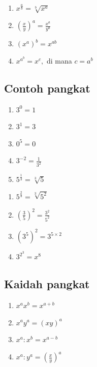 \documentclass[
  letterpaper,
  DIV=11,
  numbers=noendperiod]{scrartcl}
\providecommand{\tightlist}{%
  \setlength{\itemsep}{0pt}\setlength{\parskip}{0pt}}\usepackage{longtable,booktabs,array}
\begin{document}
\begin{enumerate}
\def\labelenumi{\arabic{enumi}.}
\setcounter{enumi}{5}
\tightlist
\item
  \(x^{\frac{a}{b}}=\sqrt[b]{x^a}\)
\item
  \({\left(\frac{x}{y}\right)}^a=\frac{x^a}{y^a}\)
\item
  \(\left(x^a\right)^b=x^{ab}\)
\item
  \(x^{a^b}=x^c,\) di mana \(c=a^b\)
\end{enumerate}

\hypertarget{contoh-pangkat}{%
\subsection{Contoh pangkat}\label{contoh-pangkat}}

\begin{enumerate}
\def\labelenumi{\arabic{enumi}.}
\tightlist
\item
  \(3^0=1\)
\item
  \(3^1=3\)
\item
  \(0^5=0\)
\item
  \(3^{-2}=\frac{1}{3^2}\)
\item
  \(5^{\frac{1}{3}}=\sqrt[3]{5}\)
\end{enumerate}

\begin{enumerate}
\def\labelenumi{\arabic{enumi}.}
\setcounter{enumi}{5}
\tightlist
\item
  \(5^{\frac{2}{3}}=\sqrt[3]{5^2}\)
\item
  \({\left(\frac{3}{5}\right)}^2=\frac{3^2}{5^2}\)
\item
  \(\left(3^5\right)^2=3^{5\times 2}\)
\item
  \(3^{2^3}=x^8\)
\end{enumerate}

\hypertarget{kaidah-pangkat-1}{%
\subsection{Kaidah pangkat}\label{kaidah-pangkat-1}}

\begin{enumerate}
\def\labelenumi{\arabic{enumi}.}
\setcounter{enumi}{9}
\item
  \(x^ax^b=x^{a+b}\)
\item
  \(x^ay^a=(xy)^a\)
\item
  \(x^a:x^b=x^{a-b}\)
\item
  \(x^a:y^a=(\frac{x}{y})^a\)
\end{enumerate}
\end{document}
